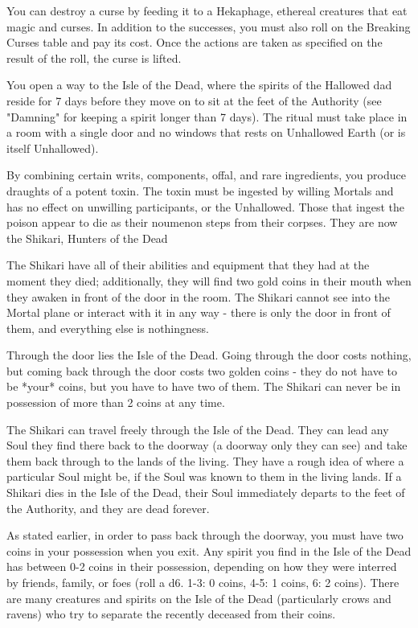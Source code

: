 {You can destroy a curse by feeding it to a Hekaphage, ethereal creatures that eat magic and curses. In addition to the successes, you must also roll on the Breaking Curses table and pay its cost. Once the actions are taken as specified on the result of the roll, the curse is lifted.

\OCCULT[
  Name=Katabasis,
  Link=occultism-katabasis,
  Success=9,
  Cost=10000\AU,
  Widdershins=3
]

You open a way to the Isle of the Dead, where the spirits of the Hallowed dad reside for 7 days before they move on to sit at the feet of the Authority (see "Damning" for keeping a spirit longer than 7 days).  The ritual must take place in a room with a single door and no windows that rests on Unhallowed Earth (or is itself Unhallowed).

By combining certain writs, components, offal, and rare ingredients, you produce \LVL draughts of a potent toxin. The toxin must be ingested by willing Mortals and has no effect on unwilling participants, or the Unhallowed.  Those that ingest the poison appear to die as their noumenon steps from their corpses.  They are now the Shikari, Hunters of the Dead

The Shikari have all of their abilities and equipment that they had at the moment they died; additionally, they will find two gold coins in their mouth when they awaken in front of the door in the room. The Shikari cannot see into the Mortal plane or interact with it in any way - there is only the door in front of them, and everything else is nothingness.

Through the door lies the Isle of the Dead.  Going through the door costs nothing, but coming back through the door costs two golden coins - they do not have to be *your* coins, but you have to have two of them.  The Shikari can never be in possession of more than 2 coins at any time.

The Shikari can travel freely through the Isle of the Dead.  They can lead any Soul they find there back to the doorway (a doorway only they can see) and take them back through to the lands of the living.  They have a rough idea of where a particular Soul might be, if the Soul was known to them in the living lands. If a Shikari dies in the Isle of the Dead, their Soul immediately departs to the feet of the Authority, and they are dead forever.  

As stated earlier, in order to pass back through the doorway, you must have two coins in your possession when you exit.  Any spirit you find in the Isle of the Dead has between 0-2 coins in their possession, depending on how they were interred by friends, family, or foes (roll a d6.  1-3: 0 coins, 4-5: 1 coins, 6: 2 coins).  There are many creatures and spirits on the Isle of the Dead (particularly crows and ravens) who try to separate the recently deceased from their coins.

}
